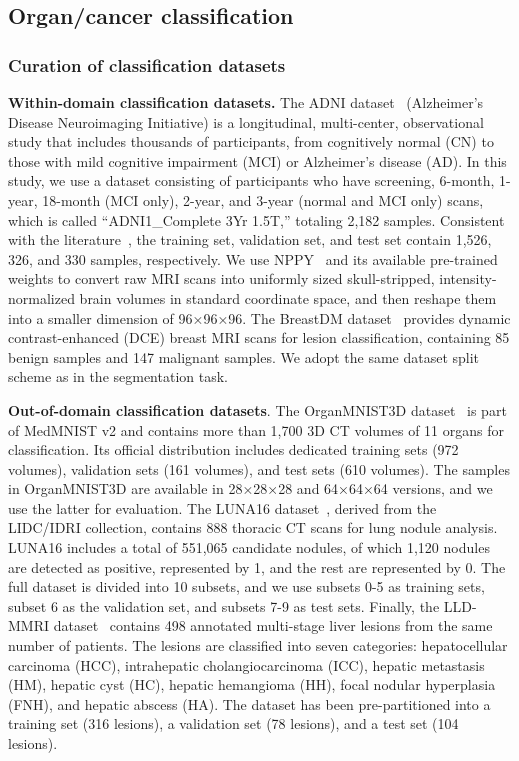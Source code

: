 \subsection{Organ/cancer classification}
\label{sec:occ}
\subsubsection{Curation of classification datasets}
\textbf{Within-domain classification datasets.} The ADNI dataset~\citep{jack2008alzheimer} (Alzheimer’s Disease Neuroimaging Initiative) is a longitudinal, multi-center, observational study that includes thousands of participants, from cognitively normal (CN) to those with mild cognitive impairment (MCI) or Alzheimer’s disease (AD).
In this study, we use a dataset consisting of participants who have screening, 6-month, 1-year, 18-month (MCI only), 2-year, and 3-year (normal and MCI only) scans, which is called ``ADNI1\_Complete 3Yr 1.5T,'' totaling 2,182 samples. Consistent with the literature~\cite{majee2024enhancing}, the training set, validation set, and test set contain 1,526, 326, and 330 samples, respectively.
We use NPPY~\cite{he2023neural} and its available pre-trained weights to convert raw MRI scans into uniformly sized skull-stripped, intensity-normalized brain volumes in standard coordinate space, and then reshape them into a smaller dimension of 96×96×96.
The BreastDM dataset~\citep{zhao2023breastdm} provides dynamic contrast-enhanced (DCE) breast MRI scans for lesion classification, containing 85 benign samples and 147 malignant samples. We adopt the same dataset split scheme as in the segmentation task.

\textbf{Out-of-domain classification datasets}. The OrganMNIST3D dataset~\citep{yang2023medmnist} is part of MedMNIST v2 and contains more than 1,700 3D CT volumes of 11 organs for classification. Its official distribution includes dedicated training sets (972 volumes), validation sets (161 volumes), and test sets (610 volumes). The samples in OrganMNIST3D are available in 28×28×28 and 64×64×64 versions, and we use the latter for evaluation.
The LUNA16 dataset~\citep{setio2017validation}, derived from the LIDC/IDRI collection, contains 888 thoracic CT scans for lung nodule analysis. LUNA16 includes a total of 551,065 candidate nodules, of which 1,120 nodules are detected as positive, represented by 1, and the rest are represented by 0. The full dataset is divided into 10 subsets, and we use subsets 0-5 as training sets, subset 6 as the validation set, and subsets 7-9 as test sets.
Finally, the LLD-MMRI dataset~\citep{lou2024sdrformer} contains 498 annotated multi-stage liver lesions from the same number of patients. The lesions are classified into seven categories: hepatocellular carcinoma (HCC), intrahepatic cholangiocarcinoma (ICC), hepatic metastasis (HM), hepatic cyst (HC), hepatic hemangioma (HH), focal nodular hyperplasia (FNH), and hepatic abscess (HA). The dataset has been pre-partitioned into a training set (316 lesions), a validation set (78 lesions), and a test set (104 lesions).

